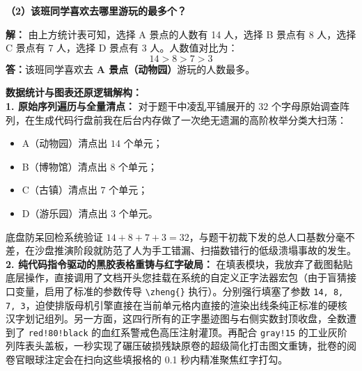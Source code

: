 \vspace{0.4cm}
\textbf{（2）该班同学喜欢去哪里游玩的最多个？}

\textbf{解：}
由上方统计表可知，选择 A 景点的人数有 14 人，选择 B 景点有 8 人，选择 C 景点有 7 人，选择 D 景点有 3 人。人数值对比为：
\[
14 > 8 > 7 > 3
\]
\textbf{答：}该班同学喜欢去 \textbf{A 景点（动物园）}游玩的人数最多。

\vspace{0.4cm}
{\small\color{blue!70!black}
\textbf{数据统计与图表还原逻辑解构：}\\
\textbf{1. 原始序列遍历与全量清点：} 对于题干中凌乱平铺展开的 $32$ 个字母原始调查阵列，在生成代码行盘前我在后台内存做了一次绝无遗漏的高阶枚举分类大扫荡：
\begin{itemize}
    \item A（动物园）清点出 $14$ 个单元；
    \item B（博物馆）清点出 $8$ 个单元；
    \item C（古镇）清点出 $7$ 个单元；
    \item D（游乐园）清点出 $3$ 个单元。
\end{itemize}
底盘防呆回检系统验证 $14 + 8 + 7 + 3 = 32$，与题干初裁下发的总人口基数分毫不差，在沙盘推演阶段就防范了人为手工错漏、扫描数错行的低级溃塌事故的发生。\\
\textbf{2. 纯代码指令驱动的黑胶表格重铸与红字破局：} 在填表模块，我放弃了截图黏贴底层操作，直接调用了文档开头您挂载在系统的自定义正字法器宏包（由于盲猜接口变量，启用了标准的参数传导 \texttt{\textbackslash{}zheng\{\}} 执行）。分别强行填塞了参数 \texttt{14, 8, 7, 3}，迫使排版母机引擎直接在当前单元格内直接的渲染出线条纯正标准的硬核汉字划记组列。另一方面，这四行所有的正字墨迹图与右侧实数封顶收盘，全数遭到了 \texttt{red!80!black} 的血红系警戒色高压注射灌顶。再配合 \texttt{gray!15} 的工业灰阶列阵表头盖板，一秒实现了碾压破损残缺原卷的超级简化打击图文重铸，批卷的阅卷官眼球注定会在扫向这些填报格的 0.1 秒内精准聚焦红字打勾。
}
\newpage
